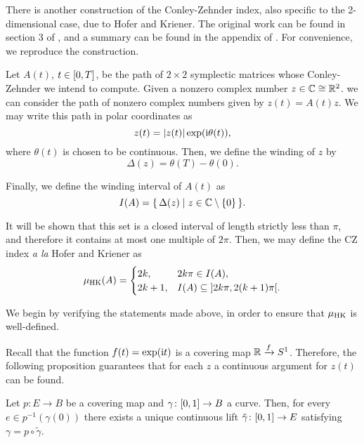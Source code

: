 There is another construction of the Conley-Zehnder index, also specific to the 2-dimensional case, due to Hofer and Kriener. The original work can be found in section 3 of \cite{hoferkriener}, and a summary can be found in the appendix of \cite{hwz}. For convenience, we reproduce the construction.

Let $A(t)$, $t \in \interval 0 T$, be the path of $2 \times 2$ symplectic matrices whose Conley-Zehnder we intend to compute. Given a nonzero complex number $z \in \mathbb{C} \cong \mathbb{R}^2$. we can consider the path of nonzero complex numbers given by $z(t) = A(t) z$. We may write this path in polar coordinates as
\begin{equation}
z(t) = \lvert z(t)\rvert \exp(\mathrm{i} \theta(t)),
\end{equation}
where $\theta(t)$ is chosen to be continuous. Then, we define the winding of $z$ by
\begin{equation}
\Delta(z) = \theta(T) - \theta(0).
\end{equation}

Finally, we define the winding interval of $A(t)$ as
\begin{equation}
I(A) = \{\, \Delta(z) \mid z \in \mathbb{C} \setminus \{0\} \,\}.
\end{equation}

It will be shown that this set is a closed interval of length strictly less than $\pi$, and therefore it contains at most one multiple of $2\pi$. Then, we may define the CZ index \textit{a la} Hofer and Kriener as
\begin{equation}\label{def:muhk}
\muhk(A) = \begin{cases}
2 k, & 2 k \pi \in I(A),\\
2k+1, & I(A) \subseteq \ointerval {2k\pi}{2(k+1)\pi}.
\end{cases} 
\end{equation}

We begin by verifying the statements made above, in order to ensure that $\mu_{\mathrm{HK}}$ is well-defined.

Recall that the function $f(t) = \exp(\mathrm{i} t)$ is a covering map $\mathbb{R} \xrightarrow{f} S^1$. Therefore, the following proposition guarantees that for each $z$ a continuous argument for $z(t)$ can be found.

\begin{prop}
Let $p \colon E \to B$ be a covering map and $\gamma \colon \interval01 \to B$ a curve. Then, for every $e \in p^{-1}(\gamma(0))$ there exists a unique continuous lift $\tilde \gamma \colon \interval01 \to E$ satisfying $\gamma = p \circ \tilde \gamma$.
\end{prop}

